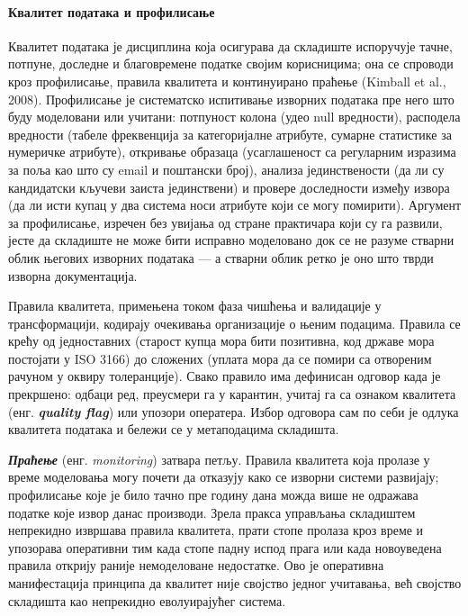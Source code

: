 \paragraph{Квалитет података и профилисање}
Квалитет података је дисциплина која осигурава да складиште испоручује тачне, потпуне, доследне и благовремене податке својим корисницима; она се спроводи кроз профилисање, правила квалитета и континуирано праћење (Kimball et al., 2008). Профилисање је систематско испитивање изворних података пре него што буду моделовани или учитани: потпуност колона (удео null вредности), расподела вредности (табеле фреквенција за категоријалне атрибуте, сумарне статистике за нумеричке атрибуте), откривање образаца (усаглашеност са регуларним изразима за поља као што су email и поштански број), анализа јединствености (да ли су кандидатски кључеви заиста јединствени) и провере доследности између извора (да ли исти купац у два система носи атрибуте који се могу помирити). Аргумент за профилисање, изречен без увијања од стране практичара који су га развили, јесте да складиште не може бити исправно моделовано док се не разуме стварни облик његових изворних података — а стварни облик ретко је оно што тврди изворна документација.

Правила квалитета, примењена током фаза чишћења и валидације у трансформацији, кодирају очекивања организације о њеним подацима. Правила се крећу од једноставних (старост купца мора бити позитивна, код државе мора постојати у ISO 3166) до сложених (уплата мора да се помири са отвореним рачуном у оквиру толеранције). Свако правило има дефинисан одговор када је прекршено: одбаци ред, преусмери га у карантин, учитај га са ознаком квалитета (енг. \textbf{\textit{quality flag}}) или упозори оператера. Избор одговора сам по себи је одлука квалитета података и бележи се у метаподацима складишта.

\textbf{\textit{Праћење}} (енг. \textit{monitoring}) затвара петљу. Правила квалитета која пролазе у време моделовања могу почети да отказују како се изворни системи развијају; профилисање које је било тачно пре годину дана можда више не одражава податке које извор данас производи. Зрела пракса управљања складиштем непрекидно извршава правила квалитета, прати стопе пролаза кроз време и упозорава оперативни тим када стопе падну испод прага или када новоуведена правила открију раније немоделоване недостатке. Ово је оперативна манифестација принципа да квалитет није својство једног учитавања, већ својство складишта као непрекидно еволуирајућег система.


